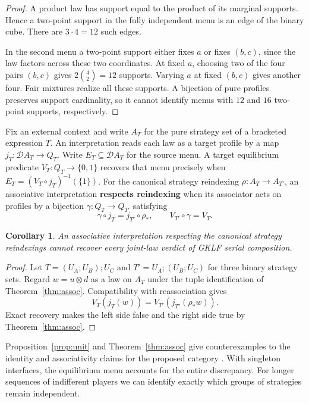 \documentclass[11pt,a4paper]{article}
\newtheorem{corollary}[theorem]{Corollary}
\theoremstyle{definition}
\newcommand{\D}{\mathcal D}
\begin{document}
\begin{proof}
    A product law has support equal to the product of its marginal supports. Hence a two-point support in the fully independent menu is an edge of the binary cube. There are $3\cdot 4=12$ such edges.

    In the second menu a two-point support either fixes $a$ or fixes $(b,c)$, since the law factors across these two coordinates. At fixed $a$, choosing two of the four pairs $(b,c)$ gives $2\binom{4}{2}=12$ supports. Varying $a$ at fixed $(b,c)$ gives another four. Fair mixtures realize all these supports. A bijection of pure profiles preserves support cardinality, so it cannot identify menus with $12$ and $16$ two-point supports, respectively.
\end{proof}

Fix an external context and write $A_T$ for the pure strategy set of a bracketed expression $T$. An interpretation reads each law as a target profile by a map $j_T:\D A_T\to Q_T$. Write $E_T\subseteq\D A_T$ for the source menu. A target equilibrium predicate $V_T:Q_T\to\{0,1\}$ recovers that menu precisely when $E_T=(V_T\circ j_T)^{-1}(\{1\})$. For the canonical strategy reindexing $\rho:A_T\to A_{T'}$, an associative interpretation \textbf{respects reindexing} when its associator acts on profiles by a bijection $\gamma:Q_T\to Q_{T'}$ satisfying
\[
    \gamma\circ j_T=j_{T'}\circ\rho_*,
    \qquad V_{T'}\circ\gamma=V_T.
\]

\begin{corollary}\label{cor:obstruction}
    An associative interpretation respecting the canonical strategy reindexings cannot recover every joint-law verdict of GKLF serial composition.
\end{corollary}
\begin{proof}
    Let $T=(U_A;U_B);U_C$ and $T'=U_A;(U_B;U_C)$ for three binary strategy sets. Regard $w=u\otimes d$ as a law on $A_T$ under the tuple identification of Theorem~\ref{thm:assoc}. Compatibility with reassociation gives
    \[
        V_T(j_T(w))=V_{T'}(j_{T'}(\rho_*w)).
    \]
    Exact recovery makes the left side false and the right side true by Theorem~\ref{thm:assoc}.
\end{proof}

Proposition~\ref{prop:unit} and Theorem~\ref{thm:assoc} give counterexamples to the identity and associativity claims for the proposed category \cite[Lemma~16 and Theorems~15 and~18]{gklf}. With singleton interfaces, the equilibrium menu accounts for the entire discrepancy. For longer sequences of indifferent players we can identify exactly which groups of strategies remain independent.
\end{document}
